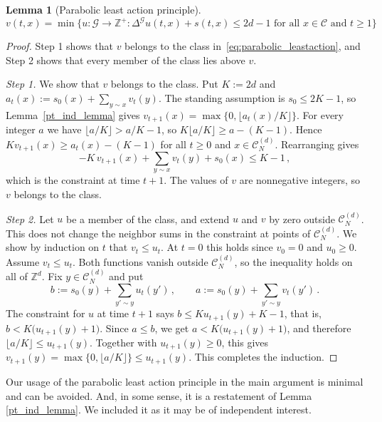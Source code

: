 \documentclass[12pt]{amsart}
\newtheorem{lemma}[theorem]{Lemma}
\begin{document}
	
	
	
	\begin{lemma}[Parabolic least action principle] \label{parabolic_comparison}
		\begin{equation} \label{eq:parabolic_leastaction}
		v(t,x) = \min\{ u: \mathcal{G} \to \mathbb{Z}^+: \Delta^{\mathcal{G}} u(t,x) + s(t,x) \leq 2d-1 \mbox{ for all $x \in \mathcal{C}$ and $t \geq 1$} \}
		\end{equation}
	\end{lemma}
	\begin{proof}
Step 1 shows that $v$ belongs to the class in~\eqref{eq:parabolic_leastaction}, and Step 2 shows that every member of the class lies above $v$.

\emph{Step 1.} We show that $v$ belongs to the class. Put $K:=2d$ and $a_t(x):=s_0(x)+\sum_{y\sim x}v_t(y)$. The standing assumption is $s_0\leq 2K-1$, so Lemma~\ref{pt_ind_lemma} gives $v_{t+1}(x)=\max\{0,\lfloor a_t(x)/K\rfloor\}$. For every integer $a$ we have $\lfloor a/K\rfloor>a/K-1$, so $K\lfloor a/K\rfloor\geq a-(K-1)$. Hence $K v_{t+1}(x)\geq a_t(x)-(K-1)$ for all $t\geq0$ and $x\in\mathcal C_N^{(d)}$. Rearranging gives
\begin{equation*}
-K\,v_{t+1}(x)+\sum_{y\sim x}v_t(y)+s_0(x)\leq K-1\,,
\end{equation*}
which is the constraint at time $t+1$. The values of $v$ are nonnegative integers, so $v$ belongs to the class.

\emph{Step 2.} Let $u$ be a member of the class, and extend $u$ and $v$ by zero outside $\mathcal C_N^{(d)}$. This does not change the neighbor sums in the constraint at points of $\mathcal C_N^{(d)}$. We show by induction on $t$ that $v_t\leq u_t$. At $t=0$ this holds since $v_0=0$ and $u_0\geq0$. Assume $v_t\leq u_t$. Both functions vanish outside $\mathcal C_N^{(d)}$, so the inequality holds on all of $\mathbb Z^d$. Fix $y\in\mathcal C_N^{(d)}$ and put
\begin{equation*}
b:=s_0(y)+\sum_{y'\sim y}u_t(y')\,,\qquad a:=s_0(y)+\sum_{y'\sim y}v_t(y')\,.
\end{equation*}
The constraint for $u$ at time $t+1$ says $b\leq Ku_{t+1}(y)+K-1$, that is, $b<K\big(u_{t+1}(y)+1\big)$. Since $a\leq b$, we get $a<K\big(u_{t+1}(y)+1\big)$, and therefore $\lfloor a/K\rfloor\leq u_{t+1}(y)$. Together with $u_{t+1}(y)\geq0$, this gives $v_{t+1}(y)=\max\{0,\lfloor a/K\rfloor\}\leq u_{t+1}(y)$. This completes the induction.

    \end{proof}
	\noindent  
	Our usage of the parabolic least action principle in the main argument is minimal
	and can be avoided. And, in some sense, it is a restatement of Lemma \ref{pt_ind_lemma}. We included it as it may be of independent interest. 
	
\end{document}
